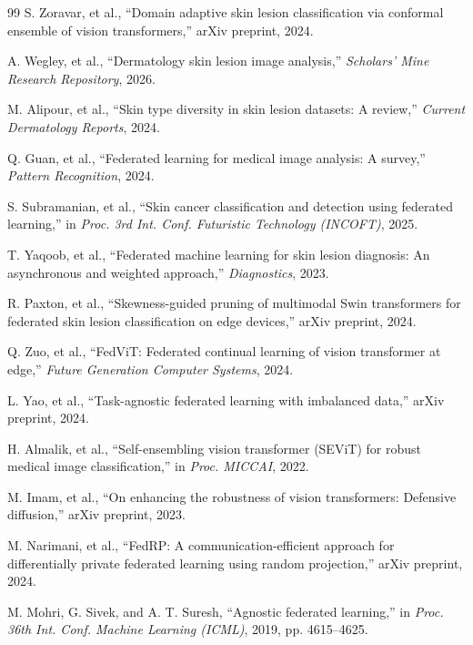 \documentclass[utf8]{FrontiersinHarvard} %
\begin{document}
\begin{thebibliography}{99}
S. Zoravar, et al.,
“Domain adaptive skin lesion classification via conformal ensemble of vision transformers,”
arXiv preprint, 2024.

A. Wegley, et al.,
“Dermatology skin lesion image analysis,”
\emph{Scholars' Mine Research Repository}, 2026.

M. Alipour, et al.,
“Skin type diversity in skin lesion datasets: A review,”
\emph{Current Dermatology Reports}, 2024.

Q. Guan, et al.,
“Federated learning for medical image analysis: A survey,”
\emph{Pattern Recognition}, 2024.

S. Subramanian, et al.,
“Skin cancer classification and detection using federated learning,”
in \emph{Proc. 3rd Int. Conf. Futuristic Technology (INCOFT)}, 2025.

T. Yaqoob, et al.,
“Federated machine learning for skin lesion diagnosis: An asynchronous and weighted approach,”
\emph{Diagnostics}, 2023.

R. Paxton, et al.,
“Skewness-guided pruning of multimodal Swin transformers for federated skin lesion classification on edge devices,”
arXiv preprint, 2024.

Q. Zuo, et al.,
“FedViT: Federated continual learning of vision transformer at edge,”
\emph{Future Generation Computer Systems}, 2024.

L. Yao, et al.,
“Task-agnostic federated learning with imbalanced data,”
arXiv preprint, 2024.

H. Almalik, et al.,
“Self-ensembling vision transformer (SEViT) for robust medical image classification,”
in \emph{Proc. MICCAI}, 2022.

M. Imam, et al.,
“On enhancing the robustness of vision transformers: Defensive diffusion,”
arXiv preprint, 2023.

M. Narimani, et al.,
“FedRP: A communication-efficient approach for differentially private federated learning using random projection,”
arXiv preprint, 2024.

M. Mohri, G. Sivek, and A. T. Suresh,
“Agnostic federated learning,”
in \emph{Proc. 36th Int. Conf. Machine Learning (ICML)}, 2019, pp. 4615--4625.

\end{thebibliography}
\fi
\end{document}
